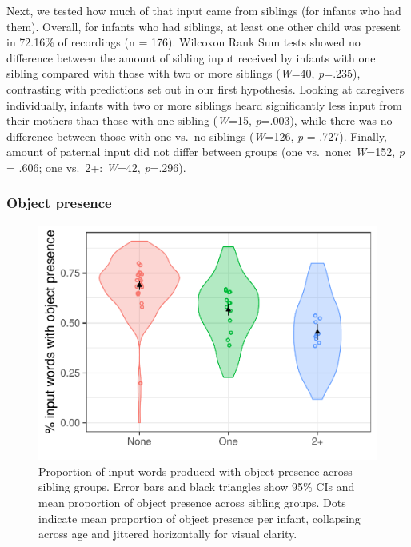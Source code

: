 \documentclass[
  english,
  man,floatsintext]{apa6}
\begin{document}
Next, we tested how much of that input came from siblings (for infants who had them). Overall, for infants who had siblings, at least one other child was present in 72.16\% of recordings (n = 176). Wilcoxon Rank Sum tests showed no difference between the amount of sibling input received by infants with one sibling compared with those with two or more siblings (\emph{W}=40, \emph{p}=.235), contrasting with predictions set out in our first hypothesis. Looking at caregivers individually, infants with two or more siblings heard significantly less input from their mothers than those with one sibling (\emph{W}=15, \emph{p}=.003), while there was no difference between those with one vs.~no siblings (\emph{W}=126, \emph{p} = .727). Finally, amount of paternal input did not differ between groups (one vs.~none: \emph{W}=152, \emph{p} = .606; one vs.~2+: \emph{W}=42, \emph{p}=.296).

\hypertarget{object-presence}{%
\subsubsection{Object presence}\label{object-presence}}

\begin{figure}
\centering
\includegraphics{SiblingsStudyText_files/figure-latex/Figure-object-presence-1.pdf}
\caption{\label{fig:Figure-object-presence}Proportion of input words produced with object presence across sibling groups. Error bars and black triangles show 95\% CIs and mean proportion of object presence across sibling groups. Dots indicate mean proportion of object presence per infant, collapsing across age and jittered horizontally for visual clarity.}
\end{figure}
\end{document}
